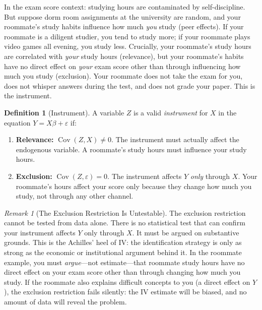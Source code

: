 \documentclass[11pt,a4paper]{article}
\theoremstyle{definition}
\newtheorem{definition}{Definition}[section]
\theoremstyle{plain}
\theoremstyle{remark}
\newtheorem{remark}{Remark}[section]
\newcommand{\Cov}{\operatorname{Cov}}
\begin{document}
In the exam score context: studying hours are contaminated by self-discipline. But suppose dorm room assignments at the university are random, and your roommate's study habits influence how much \emph{you} study (peer effects). If your roommate is a diligent studier, you tend to study more; if your roommate plays video games all evening, you study less. Crucially, your roommate's study hours are correlated with \emph{your} study hours (relevance), but your roommate's habits have no direct effect on \emph{your} exam score other than through influencing how much you study (exclusion). Your roommate does not take the exam for you, does not whisper answers during the test, and does not grade your paper. This is the instrument.

\begin{definition}[Instrument]
A variable $Z$ is a valid \emph{instrument} for $X$ in the equation $Y = X\beta + \varepsilon$ if:
\begin{enumerate}[nosep]
  \item \textbf{Relevance:} $\Cov(Z, X) \neq 0$. The instrument must actually affect the endogenous variable. A roommate's study hours must influence your study hours.
  \item \textbf{Exclusion:} $\Cov(Z, \varepsilon) = 0$. The instrument affects $Y$ \emph{only} through $X$. Your roommate's hours affect your score only because they change how much you study, not through any other channel.
\end{enumerate}
\end{definition}

\begin{remark}[The Exclusion Restriction Is Untestable]
The exclusion restriction cannot be tested from data alone. There is no statistical test that can confirm your instrument affects $Y$ only through $X$. It must be argued on substantive grounds. This is the Achilles' heel of IV: the identification strategy is only as strong as the economic or institutional argument behind it. In the roommate example, you must \emph{argue}---not estimate---that roommate study hours have no direct effect on your exam score other than through changing how much you study. If the roommate also explains difficult concepts to you (a direct effect on $Y$), the exclusion restriction fails silently: the IV estimate will be biased, and no amount of data will reveal the problem.
\end{remark}
\end{document}
